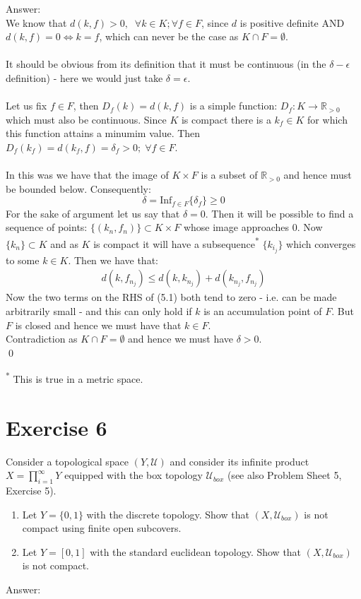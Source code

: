 \documentclass[12pt]{article}
\begin{document}
\vspace{1cm}
\noindent
Answer:\\
We know that $d(k, f) > 0, \;\; \forall k \in K; \forall f \in F$, since $d$ is positive definite AND $d(k,f) = 0 \iff k=f$, which can never be the case as $K \cap F = \emptyset$.\\
\\
It should be obvious from its definition that it must be continuous (in the $\delta-\epsilon$ definition) - here we would just take $\delta=\epsilon$.\\
\\
Let us fix $f \in F$, then $D_f(k) = d(k,f)$ is a simple function: $D_f : K \to \mathbb{R}_{>0}$ which must also be  continuous.  Since $K$ is compact there is a $k_f \in K$ for which this function attains a minumim value.
Then $D_f(k_f) = d(k_f, f) = \delta_f > 0; \; \forall f \in F$.\\
\\
In this was we have that the image of $K \times F$ is a subset of $\mathbb{R}_{>0}$ and hence must be bounded below.
Consequently:
$$ \delta = \text{Inf}_{f \in F}\{\delta_f\} \ge 0$$
For the sake of argument let us say that $\delta=0$.  Then it will be possible to find a sequence of points: $\{(k_n, f_n)\} \subset  K \times F$ whose image approaches $0$.  Now $\{k_n\} \subset K$ and as $K$ is compact it will
have a subsequence\textsuperscript{*} $\{k_{i_j}\}$ which converges to some $k \in K$. Then we have that:
\begin{align*}
    d(k, f_{n_j}) \le d(k, k_{n_j}) + d(k_{n_j}, f_{n_j}) \tag{5.1}
\end{align*}
Now the two terms on the RHS of (5.1) both tend to zero - i.e. can be made arbitrarily small - and this can only hold if $k$ is an accumulation point of $F$.  But $F$ is closed and hence we must have that $k \in F$.\\
Contradiction as $K \cap F = \emptyset$ and hence we must have $\delta > 0$.\\
\qed

\vspace{1cm}
\noindent
\textsuperscript{*} \;\;\;\; This is true in a metric space.

\newpage
\section*{Exercise 6}
\noindent
Consider a topological space $(Y,\mathcal{U})$ and consider its infinite product $X=\prod_{i=1}^{\infty}Y$ equipped with the box topology $\mathcal{U}_{box}$ (see also Problem Sheet 5, Exercise 5).
\begin{enumerate}[label=\roman*)]
\item Let $Y=\{0,1\}$ with the discrete topology. Show that $(X,\mathcal{U}_{box})$ is not compact using finite open subcovers.
\item Let $Y=[0,1]$ with the standard euclidean topology. Show that $(X,\mathcal{U}_{box})$ is not compact.
\end{enumerate}

\vspace{1cm}
\noindent
Answer:\\
\end{document}
